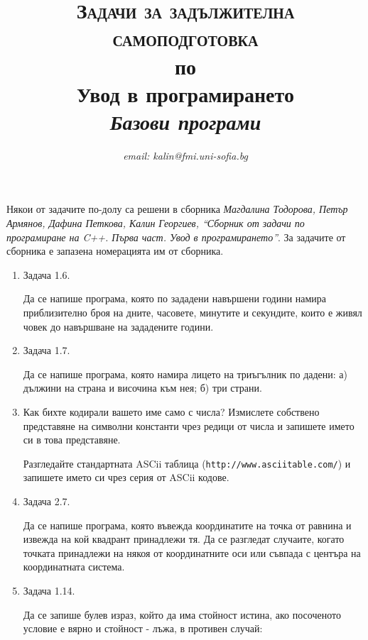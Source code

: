 \documentclass[12pt,a4paper]{article}
\author{\textit{email: kalin@fmi.uni-sofia.bg}}
\title{\textsc{Задачи за задължителна самоподготовка} \\
по \\
Увод в програмирането\\
\textit{Базови програми}}
\begin{document}
\maketitle


\small{Някои от задачите по-долу са решени в сборника \textit{Магдалина Тодорова, Петър Армянов, Дафина Петкова, Калин Георгиев, ``Сборник от задачи по програмиране на C++. Първа част. Увод в програмирането''}. За задачите от сборника е запазена номерацията им от сборника.}

\vspace{20px}


\begin{enumerate}


	\item Задача 1.6.

	Да се напише програма, която по зададени навършени години намира приблизително броя на дните, часовете, минутите и секундите, които е живял човек до навършване на зададените години.

	\item Задача 1.7.

	 Да се напише програма, която намира лицето на триъгълник по дадени: а) дължини на страна и височина към нея; б) три страни.


	\item Как бихте кодирали вашето име само с числа? Измислете собствено представяне на символни константи чрез редици от числа и запишете името си в това представяне.

	Разгледайте стандартната ASCii таблица (\texttt{http://www.asciitable.com/}) и запишете името си чрез серия от ASCii кодове.

	\item Задача 2.7.

	Да се напише програма, която въвежда координатите на точка от равнина и извежда на кой квадрант принадлежи тя. Да се разгледат случаите, когато точката принадлежи на някоя от координатните оси или съвпада с центъра на координатната система.

	\item Задача 1.14.

	Да се запише булев израз, който да има стойност истина, ако посоченото условие е вярно и стойност - лъжа, в противен случай:



\end{enumerate}
\end{document}

